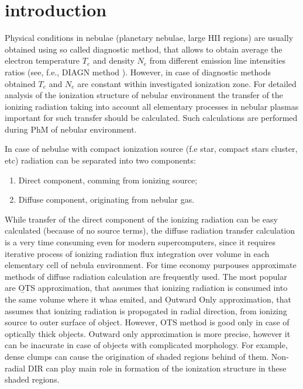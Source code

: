 \documentclass[a4paper]{article}
\begin{document}
\section*{\sc introduction}
\indent \indent Physical conditions in nebulae (planetary nebulae, large HII regions) 
are usually obtained using so called diagnostic method, that allows to obtain average 
the electron temperature $T_e$ and density $N_e$ from different emission line intensities ratios 
(see, f.e., DIAGN method \cite{DIAGN}). However, in case of diagnostic methods 
obtained $T_e$ and $N_e$ are constant within investigated ionization zone. 
For detailed analysis of the ionization structure of nebular environment 
the transfer of the ionizing radiation taking into account all elementary processes
in nebular plasmas important for such transfer should be calculated.
Such calculations are performed during PhM of nebular environment.

In case of nebulae with compact ionization source (f.e star, compact stars cluster, etc) 
radiation can be separated into two components:
\begin{enumerate}
\item Direct component, comming from ionizing source;
\item Diffuse component, originating from nebular gas.
\end{enumerate}

While transfer of the direct component of the ionizing radiation can be easy calculated
(because of no source terms), the diffuse radiation transfer calculation 
is a very time consuming even for modern supercomputers, 
since it requires iterative process of ionizing radiation flux integration over volume 
in each elementary cell of nebula environment. For time economy purpouses approximate methods 
of diffuse radiation calculation are frequently used. The most popular are {\b OTS} approximation, 
that assumes that ionizing radiation is consumed into the same volume where it whas emited, 
and {\b Outward Only} approximation, that assumes that ionizing radiation is propogated 
in radial direction, from ionizing source to outer surface of object. However, OTS method 
is good only in case of optically thick objects. Outward only approximation is more precise, 
however it can be inacurate in case of objects with complicated morphology. 
For example, dense clumps can cause the origination of shaded regions behind of them.
Non-radial DIR can play main role in formation of the ionization structure in these shaded
regions.
\end{document}
